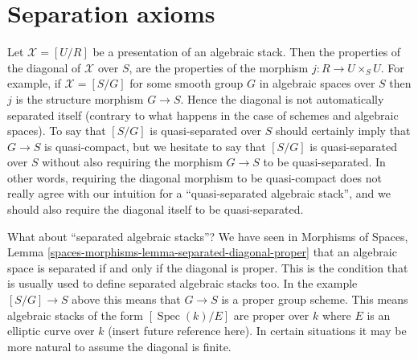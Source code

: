 \documentclass{stacks-project}
\theoremstyle{plain}
\theoremstyle{definition}
\theoremstyle{remark}
\numberwithin{equation}{subsection}
\def\Spec{\mathop{\mathrm{Spec}}}
\begin{document}
\section{Separation axioms}
\label{section-separated}

\noindent
Let $\mathcal{X} = [U/R]$ be a presentation of an algebraic stack.
Then the properties of the diagonal of $\mathcal{X}$ over $S$, are
the properties of the morphism $j : R \to U \times_S U$. For example,
if $\mathcal{X} = [S/G]$ for some smooth group $G$ in algebraic spaces
over $S$ then $j$ is the structure morphism $G \to S$. Hence the diagonal
is not automatically separated itself (contrary to what happens in the
case of schemes and algebraic spaces). To say that $[S/G]$ is quasi-separated
over $S$ should certainly imply that $G \to S$ is quasi-compact, but we
hesitate to say that $[S/G]$ is quasi-separated over $S$ without also
requiring the morphism $G \to S$ to be quasi-separated. In other words,
requiring the diagonal morphism to be quasi-compact does not really agree
with our intuition for a ``quasi-separated algebraic stack'', and we should
also require the diagonal itself to be quasi-separated.

\medskip\noindent
What about ``separated algebraic stacks''? We have seen in
Morphisms of Spaces,
Lemma \ref{spaces-morphisms-lemma-separated-diagonal-proper}
that an algebraic space is separated if and only if the diagonal is proper.
This is the condition that is usually used to define separated algebraic
stacks too. In the example $[S/G] \to S$ above this means that $G \to S$
is a proper group scheme. This means algebraic stacks of the form
$[\Spec(k)/E]$ are proper over $k$ where $E$ is an elliptic curve
over $k$ (insert future reference here). In certain situations it may be
more natural to assume the diagonal is finite.
\end{document}
